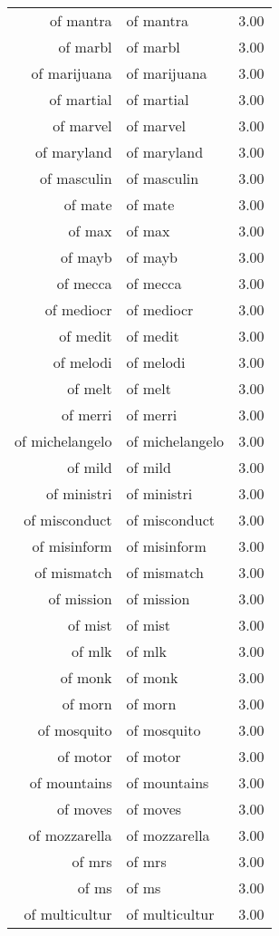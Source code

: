 \begin{table}[ht]
\begin{tabular}{rlr}
  of mantra & of mantra & 3.00 \\ 
  of marbl & of marbl & 3.00 \\ 
  of marijuana & of marijuana & 3.00 \\ 
  of martial & of martial & 3.00 \\ 
  of marvel & of marvel & 3.00 \\ 
  of maryland & of maryland & 3.00 \\ 
  of masculin & of masculin & 3.00 \\ 
  of mate & of mate & 3.00 \\ 
  of max & of max & 3.00 \\ 
  of mayb & of mayb & 3.00 \\ 
  of mecca & of mecca & 3.00 \\ 
  of mediocr & of mediocr & 3.00 \\ 
  of medit & of medit & 3.00 \\ 
  of melodi & of melodi & 3.00 \\ 
  of melt & of melt & 3.00 \\ 
  of merri & of merri & 3.00 \\ 
  of michelangelo & of michelangelo & 3.00 \\ 
  of mild & of mild & 3.00 \\ 
  of ministri & of ministri & 3.00 \\ 
  of misconduct & of misconduct & 3.00 \\ 
  of misinform & of misinform & 3.00 \\ 
  of mismatch & of mismatch & 3.00 \\ 
  of mission & of mission & 3.00 \\ 
  of mist & of mist & 3.00 \\ 
  of mlk & of mlk & 3.00 \\ 
  of monk & of monk & 3.00 \\ 
  of morn & of morn & 3.00 \\ 
  of mosquito & of mosquito & 3.00 \\ 
  of motor & of motor & 3.00 \\ 
  of mountains & of mountains & 3.00 \\ 
  of moves & of moves & 3.00 \\ 
  of mozzarella & of mozzarella & 3.00 \\ 
  of mrs & of mrs & 3.00 \\ 
  of ms & of ms & 3.00 \\ 
  of multicultur & of multicultur & 3.00 \\ 

\end{tabular}
\end{table}
